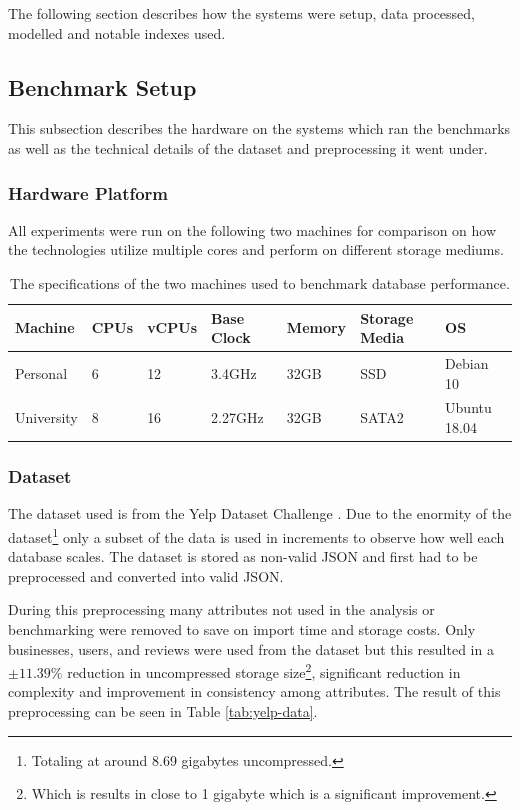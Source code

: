 The following section describes how the systems were setup, data processed, modelled and notable indexes used.

\subsection{Benchmark Setup}

This subsection describes the hardware on the systems which ran the benchmarks as well as the technical details of the dataset and preprocessing it went under.

\subsubsection{Hardware Platform}

All experiments were run on the following two machines for comparison on how the technologies utilize multiple cores and perform on different storage mediums.

\begin{table}[h!]
    \centering
    \begin{tabular}{ |p{2cm}|p{1.5cm}|p{1.5cm}|p{1.6cm}|p{1.5cm}|p{2cm}|p{2cm}|}
        \hline
        \rowcolor{Gray}
        Machine    & CPUs & vCPUs & Base Clock & Memory & Storage Media & OS           \\
        \hline
        Personal   & 6    & 12    & 3.4GHz     & 32GB   & SSD           & Debian 10    \\
        University & 8    & 16    & 2.27GHz    & 32GB   & SATA2         & Ubuntu 18.04 \\
        \hline
    \end{tabular}
    \vspace*{5mm}
    \caption{The specifications of the two machines used to benchmark database performance.}
    \label{tab:hardware}
\end{table}

\subsubsection{Dataset}
The dataset used is from the Yelp Dataset Challenge \cite{yelpdataset}. Due to the enormity of the dataset\footnote{Totaling at around 8.69 gigabytes uncompressed.} only a subset of the data is used in increments to observe how well each database scales. The dataset is stored as non-valid JSON and first had to be preprocessed and converted into valid JSON.

During this preprocessing many attributes not used in the analysis or benchmarking were removed to save on import time and storage costs. Only businesses, users, and reviews were used from the dataset but this resulted in a $\pm11.39\%$ reduction in uncompressed storage size\footnote{Which is results in close to 1 gigabyte which is a significant improvement.}, significant reduction in complexity and improvement in consistency among attributes. The result of this preprocessing can be seen in Table \ref{tab:yelp-data}.


